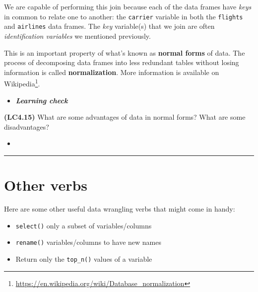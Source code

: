 \documentclass[12pt, krantz2,]{krantz}
\makeatletter
\newenvironment{Shaded}{\begin{snugshade}}{\end{snugshade}}
\newcommand{\DataTypeTok}[1]{\textcolor[rgb]{0.27,0.27,0.27}{#1}}
\newcommand{\KeywordTok}[1]{\textcolor[rgb]{0.27,0.27,0.27}{\textbf{#1}}}
\newcommand{\NormalTok}[1]{#1}
\newcommand{\OperatorTok}[1]{\textcolor[rgb]{0.43,0.43,0.43}{\textbf{#1}}}
\newcommand{\StringTok}[1]{\textcolor[rgb]{0.5,0.5,0.5}{#1}}
\providecommand{\tightlist}{%
  \setlength{\itemsep}{0pt}\setlength{\parskip}{0pt}}
\renewcommand{\href}[2]{#2\footnote{\url{#1}}}
\newenvironment{kframe}{%
\medskip{}
\setlength{\fboxsep}{.8em}
 \def\at@end@of@kframe{}%
 \ifinner\ifhmode%
  \def\at@end@of@kframe{\end{minipage}}%
  \begin{minipage}{\columnwidth}%
 \fi\fi%
 \def\FrameCommand##1{\hskip\@totalleftmargin \hskip-\fboxsep
 \colorbox{shadecolor}{##1}\hskip-\fboxsep
     \hskip-\linewidth \hskip-\@totalleftmargin \hskip\columnwidth}%
 \MakeFramed {\advance\hsize-\width
   \@totalleftmargin\z@ \linewidth\hsize
   \@setminipage}}%
 {\par\unskip\endMakeFramed%
 \at@end@of@kframe}
\renewenvironment{Shaded}{\begin{kframe}}{\end{kframe}}
\newenvironment{rmdblock}[1]
  {\begin{shaded*}
  \begin{itemize}
  \renewcommand{\labelitemi}{
    \raisebox{-.7\height}[0pt][0pt]{
    }
  }
  \item
  }
  {
  \end{itemize}
  \end{shaded*}
  }
\newenvironment{learncheck}
  {\begin{rmdblock}{warning}}
  {\end{rmdblock}}
\makeatother
\begin{document}
\begin{Shaded}
\end{Shaded}

We are capable of performing this join because each of the data frames have \emph{keys} in common to relate one to another: the \texttt{carrier} variable in both the \texttt{flights} and \texttt{airlines} data frames. The \emph{key} variable(s) that we join are often \emph{identification variables} we mentioned previously.

This is an important property of what's known as \textbf{normal forms} of data. The process of decomposing data frames into less redundant tables without losing information is called \textbf{normalization}. More information is available on \href{https://en.wikipedia.org/wiki/Database_normalization}{Wikipedia}.

\begin{learncheck}
\textbf{\emph{Learning check}}
\end{learncheck}

\textbf{(LC4.15)} What are some advantages of data in normal forms? What are some disadvantages?

\begin{learncheck}

\end{learncheck}

\begin{center}\rule{0.5\linewidth}{\linethickness}\end{center}

\hypertarget{other-verbs}{%
\section{Other verbs}\label{other-verbs}}

Here are some other useful data wrangling verbs that might come in handy:

\begin{itemize}
\tightlist
\item
  \texttt{select()} only a subset of variables/columns
\item
  \texttt{rename()} variables/columns to have new names
\item
  Return only the \texttt{top\_n()} values of a variable
\end{itemize}
\end{document}

